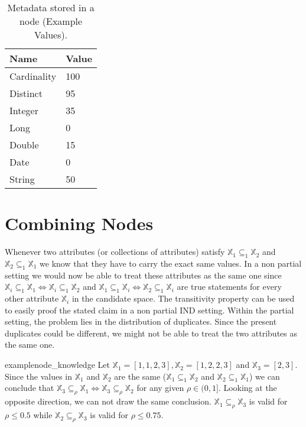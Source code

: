 \begin{table}[]
    \centering
    \begin{tabular}{l|l}
        Name & Value \\
        \hline
        Cardinality & 100 \\
        Distinct & 95 \\
        Integer & 35 \\
        Long & 0 \\
        Double & 15 \\
        Date & 0 \\
        String & 50
    \end{tabular}
    \caption{Metadata stored in a node (Example Values).}
    \label{tab:node_metadata}
\end{table}

\section{Combining Nodes}\label{sec:comb_nodes}
Whenever two attributes (or collections of attributes) satisfy $\mathbb{X}_1 \subseteq_1 \mathbb{X}_2$ and $\mathbb{X}_2 \subseteq_1 \mathbb{X}_1$ we know that they have to carry the exact same values. In a non partial setting we would now be able to treat these attributes as the same one since $\mathbb{X}_i \subseteq_1 \mathbb{X}_1 \iff \mathbb{X}_i \subseteq_1 \mathbb{X}_2$ and $\mathbb{X}_1 \subseteq_1 \mathbb{X}_i \iff \mathbb{X}_2 \subseteq_1 \mathbb{X}_i$ are true statements for every other attribute $\mathbb{X}_i$ in the candidate space. The transitivity property can be used to easily proof the stated claim in a non partial IND setting. Within the partial setting, the problem lies in the distribution of duplicates. Since the present duplicates could be different, we might not be able to treat the two attributes as the same one.

\begin{restatable}{example}{node_knowledge}\label{exmp:node_knowledge}
    Let $\mathbb{X}_1 = [1, 1, 2, 3], \mathbb{X}_2 = [1, 2, 2, 3]$ and $\mathbb{X}_3 = [2, 3]$. Since the values in $\mathbb{X}_1$ and $\mathbb{X}_2$ are the same ($\mathbb{X}_1 \subseteq_1 \mathbb{X}_2$ and $\mathbb{X}_2 \subseteq_1 \mathbb{X}_1$) we can conclude that $\mathbb{X}_3 \subseteq_\rho \mathbb{X}_1 \iff \mathbb{X}_3 \subseteq_\rho \mathbb{X}_2$ for any given $\rho \in (0, 1]$. Looking at the opposite direction, we can not draw the same conclusion. $\mathbb{X}_1 \subseteq_\rho \mathbb{X}_3$ is valid for $\rho \leq 0.5$ while $\mathbb{X}_2 \subseteq_\rho \mathbb{X}_3$ is valid for $\rho \leq 0.75$.
\end{restatable}

